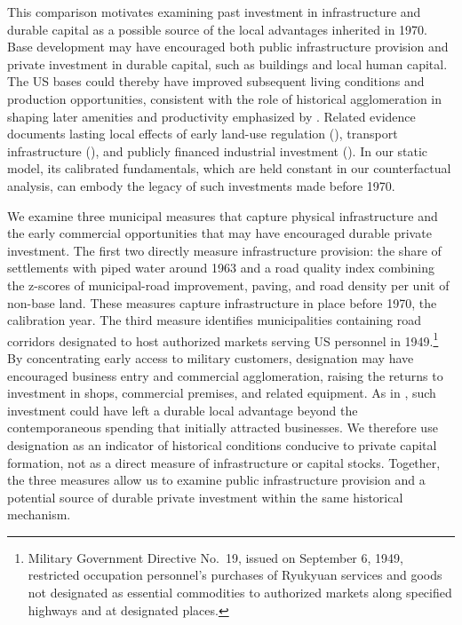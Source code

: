 \documentclass[12pt, unicode, a4paper]{article}
\newcommand{\1}{\mbox{1}\hspace{-0.25em}\mbox{l}} %
\begin{document}
This comparison motivates examining past investment in infrastructure and durable capital as a possible source of the local advantages inherited in 1970. Base development may have encouraged both public infrastructure provision and private investment in durable capital, such as buildings and local human capital. The US bases could thereby have improved subsequent living conditions and production opportunities, consistent with the role of historical agglomeration in shaping later amenities and productivity emphasized by \citet{allen2020persistence}. Related evidence documents lasting local effects of early land-use regulation (\citealt{twinam2018longrun}), transport infrastructure (\citealt{jedwab2016permanent}), and publicly financed industrial investment (\citealt{garin2025long}). In our static model, its calibrated fundamentals, which are held constant in our counterfactual analysis, can embody the legacy of such investments made before 1970.

We examine three municipal measures that capture physical infrastructure and the early commercial opportunities that may have encouraged durable private investment. The first two directly measure infrastructure provision: the share of settlements with piped water around 1963 and a road quality index combining the z-scores of municipal-road improvement, paving, and road density per unit of non-base land. These measures capture infrastructure in place before 1970, the calibration year.
The third measure identifies municipalities containing road corridors designated to host authorized markets serving US personnel in 1949.\footnote{Military Government Directive No.\ 19, issued on September 6, 1949, restricted occupation personnel's purchases of Ryukyuan services and goods not designated as essential commodities to authorized markets along specified highways and at designated places.
} By concentrating early access to military customers, designation may have encouraged business entry and commercial agglomeration, raising the returns to investment in shops, commercial premises, and related equipment. As in \cite{allen2020persistence}, such investment could have left a durable local advantage beyond the contemporaneous spending that initially attracted businesses. We therefore use designation as an indicator of historical conditions conducive to private capital formation, not as a direct measure of infrastructure or capital stocks. Together, the three measures allow us to examine public infrastructure provision and a potential source of durable private investment within the same historical mechanism.
\end{document}

